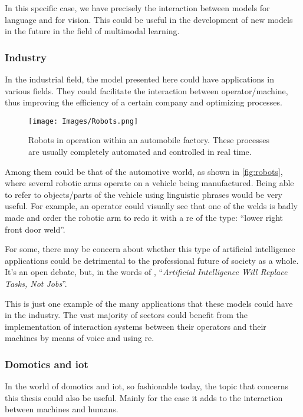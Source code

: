 In this specific case, we have precisely the interaction between models for
language and for vision. This could be useful in the development of new models
in the future in the field of multimodal learning.

\subsubsection{Industry}
In the industrial field, the model presented here could have applications in
various fields. They could facilitate the interaction between operator/machine,
thus improving the efficiency of a certain company and optimizing processes.

\begin{figure}[htb]
  \centering
  \texttt{[image: Images/Robots.png]}
  \caption[Robots in automobile factory]{Robots in operation within an
    automobile factory. These processes are usually completely automated and
    controlled in real time.}
  \label{fig:robots}
\end{figure}

Among them could be that of the automotive world, as shown in
\vref{fig:robots}, where several robotic arms operate on a vehicle being
manufactured. Being able to refer to objects/parts of the vehicle using
linguistic phrases would be very useful. For example, an operator could
visually see that one of the welds is badly made and order the robotic arm to
redo it with a \gls{re} of the type: ``lower right front door weld''.

\begin{remarkBox}
  For some, there may be concern about whether this type of artificial
  intelligence applications could be detrimental to the professional future of
  society as a whole. It's an open debate, but, in the words of
  \citeauthor*{contributor18:artif_intel_will_replac_tasks_not_jobs}
  \cite{contributor18:artif_intel_will_replac_tasks_not_jobs},
  ``\textit{Artificial Intelligence Will Replace Tasks, Not Jobs}''.
\end{remarkBox}

This is just one example of the many applications that these models could have
in the industry. The vast majority of sectors could benefit from the
implementation of interaction systems between their operators and their
machines by means of voice and using \gls{re}.

\subsubsection{Domotics and \acs*{iot}}
In the world of domotics and \gls{iot}, so fashionable today, the topic that
concerns this thesis could also be useful. Mainly for the ease it adds to the
interaction between machines and humans.

